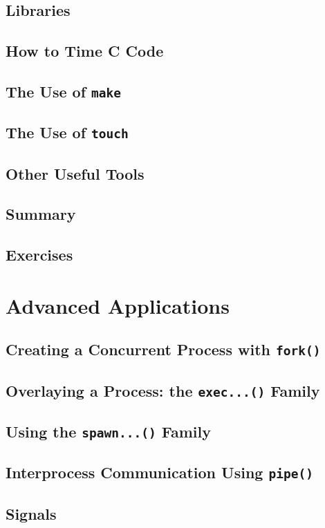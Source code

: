 \documentclass{article}
\begin{document}
\section{Libraries}
\section{How to Time C Code}
\section{The Use of \texttt{make}}
\section{The Use of \texttt{touch}}
\section{Other Useful Tools}
\section{Summary}
\section{Exercises}

\chapter{Advanced Applications}

\section{Creating a Concurrent Process with \texttt{fork()}}
\section{Overlaying a Process: the \texttt{exec...()} Family}
\section{Using the \texttt{spawn...()} Family}
\section{Interprocess Communication Using \texttt{pipe()}}
\section{Signals}
\end{document}
